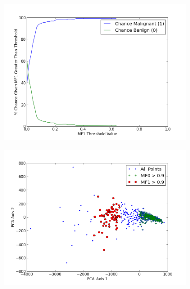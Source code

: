 \documentclass{article}
\begin{document}
\begin{figure}[h!]
  \centering
    \includegraphics[width=0.85\textwidth]{figure_2.png}
  \label{fig:f2}
\end{figure}

\begin{figure}[h!]
  \centering
    \includegraphics[width=0.85\textwidth]{figure_3.png}
  \label{fig:f3}
\end{figure}
\end{document}
